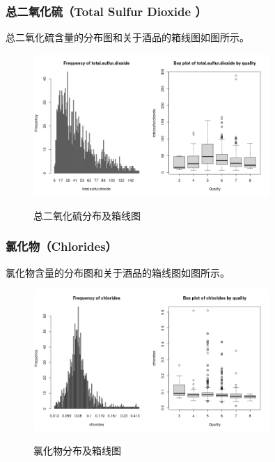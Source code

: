 \documentclass[fontset=ubuntu]{ctexart}
\begin{document}
            \subsubsection{总二氧化硫（Total Sulfur Dioxide ）}
                总二氧化硫含量的分布图和关于酒品的箱线图如图所示。
                \begin{figure}[htbp]
                    \centering
                    \includegraphics[width=0.8\textwidth]{../figures/total.sulfur.dioxide-plot.png}
                    \label{fig:total.sulfur.dioxide}
                    \caption{总二氧化硫分布及箱线图}
                \end{figure}   

            \subsubsection{氯化物（Chlorides）}
            氯化物含量的分布图和关于酒品的箱线图如图所示。
            \begin{figure}[htbp]
                \centering
                \includegraphics[width=0.8\textwidth]{../figures/chlorides-plot.png}
                \label{fig:chlorides}
                \caption{氯化物分布及箱线图}
            \end{figure} 
        
\end{document}
